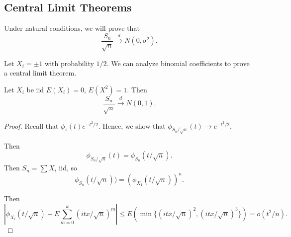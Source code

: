 \documentclass[11pt]{scrartcl}
\begin{document}
\subsection{Central Limit Theorems}
Under natural conditions, we will prove that 
$$\frac{S_n}{\sqrt{n}} \xrightarrow{d} N(0, \sigma^2).$$
\begin{example} Let $X_i = \pm 1$ with probability $1/2$.  We can analyze binomial coefficients to prove a central limit theorem.
\end{example}
\begin{thm} Let $X_i$ be iid $E(X_i) = 0$, $E(X^2) = 1$.  Then
$$\frac{S_n}{\sqrt{n}} \xrightarrow{d} N(0, 1).$$
\end{thm}
\begin{proof}
Recall that $\phi_z(t) e^{-t^2/2}$.  Hence, we show that $\phi_{S_n/\sqrt{n}}(t) \to e^{-t^2/2}$.

Then $$\phi_{S_n/\sqrt{n}}(t) = \phi_{S_n}(t/\sqrt{n}).$$  Then $S_n = \sum X_i$ iid, so $$\phi_{S_n}(t/\sqrt{n})) = (\phi_{X_1}(t/\sqrt{n}))^n.$$

Then $$|\phi_{X_i}(t/\sqrt{n}) - E\sum_{m=0}^k (itx/\sqrt{n})^m|\le E(\min\{(itx/\sqrt{n})^2, (itx/\sqrt{n})^3\}) = o(t^2/n).$$
\end{proof}
\end{document}

